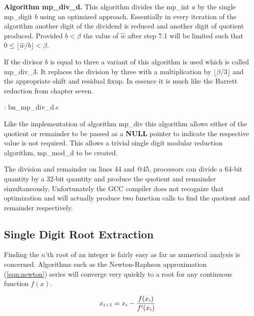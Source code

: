 \documentclass[b5paper]{book}
\begin{document}
\textbf{Algorithm mp\_div\_d.}
This algorithm divides the mp\_int $a$ by the single mp\_digit $b$ using an optimized approach.  Essentially in every iteration of the
algorithm another digit of the dividend is reduced and another digit of quotient produced.  Provided $b < \beta$ the value of $\hat w$
after step 7.1 will be limited such that $0 \le \lfloor \hat w / b \rfloor < \beta$.  

If the divisor $b$ is equal to three a variant of this algorithm is used which is called mp\_div\_3.  It replaces the division by three with
a multiplication by $\lfloor \beta / 3 \rfloor$ and the appropriate shift and residual fixup.  In essence it is much like the Barrett reduction
from chapter seven.  

\vspace{+3mm}\begin{small}
\hspace{-5.1mm}{\bf File}: bn\_mp\_div\_d.c
\vspace{-3mm}
\begin{alltt}
\end{alltt}
\end{small}

Like the implementation of algorithm mp\_div this algorithm allows either of the quotient or remainder to be passed as a \textbf{NULL} pointer to
indicate the respective value is not required.  This allows a trivial single digit modular reduction algorithm, mp\_mod\_d to be created.

The division and remainder on lines 44 and @45,%
processors can divide a 64-bit quantity by a 32-bit quantity and produce the quotient and remainder simultaneously.  Unfortunately the GCC 
compiler does not recognize that optimization and will actually produce two function calls to find the quotient and remainder respectively.  

\subsection{Single Digit Root Extraction}

Finding the $n$'th root of an integer is fairly easy as far as numerical analysis is concerned.  Algorithms such as the Newton-Raphson approximation 
(\ref{eqn:newton}) series will converge very quickly to a root for any continuous function $f(x)$.  

\begin{equation}
x_{i+1} = x_i - {f(x_i) \over f'(x_i)}
\label{eqn:newton}
\end{equation}
\end{document}
